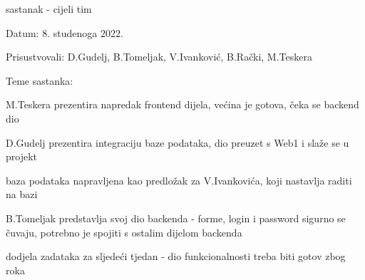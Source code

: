 \begin{packed_enum}
			\item  sastanak - cijeli tim
			\item[] \begin{packed_item}
				\item Datum: 8. studenoga 2022.
				\item Prisustvovali: D.Gudelj, B.Tomeljak, V.Ivanković, B.Rački, M.Teskera
				\item Teme sastanka:
				\begin{packed_item}
					\item M.Teskera prezentira napredak frontend dijela, većina je gotova, čeka se backend dio
					\item D.Gudelj prezentira integraciju baze podataka, dio preuzet s Web1 i slaže se u projekt
					\item baza podataka napravljena kao predložak za V.Ivankovića, koji nastavlja raditi na bazi
					\item B.Tomeljak predstavlja svoj dio backenda - forme, login i password sigurno se čuvaju, potrebno je spojiti s ostalim dijelom backenda
					\item dodjela zadataka za sljedeći tjedan - dio funkcionalnosti treba biti gotov zbog roka
				\end{packed_item}
			\end{packed_item}
			

\end{packed_enum}
